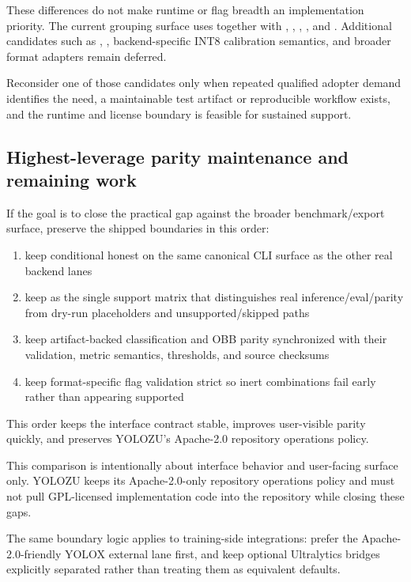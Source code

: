 These differences do not make runtime or flag breadth an implementation
priority. The current grouping surface uses  together with
, , ,
, and . Additional candidates such as
, , backend-specific INT8 calibration semantics, and
broader format adapters remain deferred.

Reconsider one of those candidates only when repeated qualified adopter demand
identifies the need, a maintainable test artifact or reproducible workflow
exists, and the runtime and license boundary is feasible for sustained support.

\subsection{Highest-leverage parity maintenance and remaining work}
If the goal is to close the practical gap against the broader benchmark/export
surface, preserve the shipped boundaries in this order:
\begin{enumerate}
  \item keep conditional  honest on the same canonical CLI surface as the other real backend lanes
  \item keep  as the single support matrix that distinguishes real inference/eval/parity
  from dry-run placeholders and unsupported/skipped paths
  \item keep artifact-backed classification and OBB parity synchronized with
  their validation, metric semantics, thresholds, and source checksums
  \item keep format-specific flag validation strict so inert combinations fail
  early rather than appearing supported
\end{enumerate}

This order keeps the interface contract stable, improves user-visible parity
quickly, and preserves YOLOZU's Apache-2.0 repository operations policy.

This comparison is intentionally about interface behavior and user-facing
surface only. YOLOZU keeps its Apache-2.0-only repository operations policy and
must not pull GPL-licensed implementation code into the repository while
closing these gaps.

The same boundary logic applies to training-side integrations: prefer the
Apache-2.0-friendly YOLOX external lane first, and keep optional Ultralytics
bridges explicitly separated rather than treating them as equivalent defaults.

